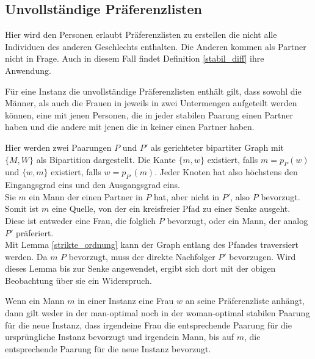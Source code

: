 \subsection{Unvollständige Präferenzlisten}

Hier wird den Personen erlaubt Präferenzlisten zu erstellen die nicht alle Individuen des anderen Geschlechts enthalten. Die Anderen kommen als Partner nicht in Frage. Auch in diesem Fall findet Definition \ref{stabil_diff} ihre Anwendung.

\begin{Theorem}
\label{partner_oder_nicht}
  Für eine Instanz die unvollständige Präferenzlisten enthält gilt, dass sowohl die Männer, als auch die Frauen in jeweils in zwei Untermengen aufgeteilt werden können, eine mit jenen Personen, die in jeder stabilen Paarung einen Partner haben und die andere mit jenen die in keiner einen Partner haben.
\end{Theorem}

\begin{Beweis}
\label{partner_oder_nicht_bew}
  Hier werden zwei Paarungen $P$ und $P'$ als gerichteter bipartiter Graph mit $\{M,W\}$ als Bipartition dargestellt. Die Kante $\{m,w\}$ existiert, falls $m = p_{P}(w)$ und $\{w,m\}$ existiert, falls $w = p_{P'}(m)$. Jeder Knoten hat also höchstens den Eingangsgrad eins und den Ausgangsgrad eins.\\
  Sie $m$ ein Mann der einen Partner in $P$ hat, aber nicht in $P'$, also $P$ bevorzugt. Somit ist $m$ eine Quelle, von der ein kreisfreier Pfad zu einer Senke ausgeht. Diese ist entweder eine Frau, die folglich $P$ bevorzugt, oder ein Mann, der analog $P'$ präferiert.\\
  Mit Lemma \ref{strikte_ordnung} kann der Graph entlang des Pfandes traversiert werden. Da $m$ $P$ bevorzugt, muss der direkte Nachfolger $P'$ bevorzugen. Wird dieses Lemma bis zur Senke angewendet, ergibt sich dort mit der obigen Beobachtung über sie ein Widerspruch.
\end{Beweis}


\begin{Theorem}
\label{element_enfuegen}
  Wenn ein Mann $m$ in einer Instanz eine Frau $w$ an seine Prä\-fe\-renz\-lis\-te anhängt, dann gilt weder in der man-optimal noch in der woman-optimal stabilen Paarung für die neue Instanz, dass irgendeine Frau die entsprechende Paarung für die ursprüngliche Instanz bevorzugt und irgendein Mann, bis auf $m$, die entsprechende Paarung für die neue Instanz bevorzugt.
\end{Theorem}

